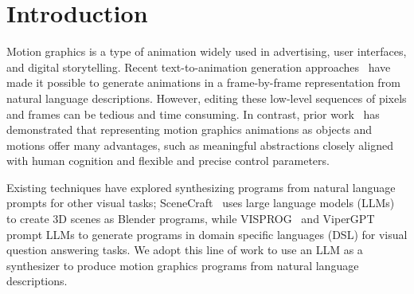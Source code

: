 \section{Introduction}
\label{sec:introduction}


Motion graphics is a type of animation widely used in advertising,
user interfaces, and digital storytelling.
Recent text-to-animation generation approaches~\cite{gal2024breathing,
  luo2023videofusion, chen2024videocrafter2, wang2023modelscope} have
made it possible to generate animations in a frame-by-frame
representation from natural language descriptions.
However, editing these low-level sequences of pixels and frames can be
tedious and time consuming.  In contrast, prior
work~\cite{zhang2023motion} has demonstrated that representing motion
graphics animations as objects and motions offer many advantages, such
as meaningful abstractions closely aligned with human cognition and
flexible and precise control parameters.

Existing techniques have explored synthesizing programs from natural
language prompts for other visual tasks;
SceneCraft~\cite{hu2025scenecraft} uses large language models (LLMs)
to create 3D scenes as Blender programs, while
VISPROG~\cite{gupta2023visprog} and
ViperGPT~\cite{surismenon2023vipergpt} prompt LLMs to generate
programs in domain specific languages (DSL) for visual question
answering tasks.  We adopt this line of work to use an LLM as a
synthesizer to produce motion graphics programs from natural language
descriptions.


